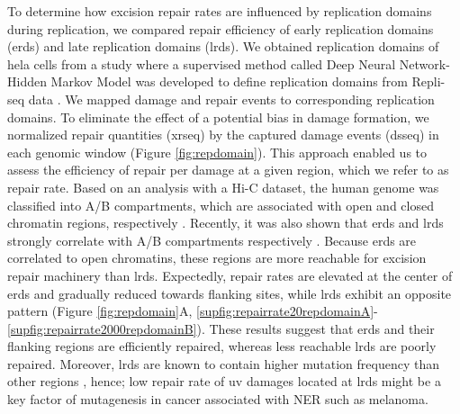 To determine how excision repair rates are influenced by replication domains during replication, we compared repair efficiency of early replication domains (\gls{erd}s) and late replication domains (\gls{lrd}s). We obtained replication domains of \gls{hela} cells from a study where a supervised method called Deep Neural Network-Hidden Markov Model was developed to define replication domains from Repli-seq data \citep{liu2016novo}. We mapped damage and repair events to corresponding replication domains. To eliminate the effect of a potential bias in damage formation, we normalized repair quantities (\gls{xrseq}) by the captured damage events (\gls{dsseq}) in each genomic window (Figure \ref{fig:repdomain}). This approach enabled us to assess the efficiency of repair per damage at a given region, which we refer to as repair rate. Based on an analysis with a Hi-C dataset, the human genome was classified into A/B compartments, which are associated with open and closed chromatin regions, respectively \citep{lieberman2009comprehensive}. Recently, it was also shown that \gls{erd}s and \gls{lrd}s strongly correlate with A/B compartments respectively \citep{pope2014topologically,ryba2010evolutionarily}. Because \gls{erd}s are correlated to open chromatins, these regions are more reachable for excision repair machinery than \gls{lrd}s. Expectedly, repair rates are elevated at the center of \gls{erd}s and gradually reduced towards flanking sites, while \gls{lrd}s exhibit an opposite pattern (Figure \ref{fig:repdomain}A, \ref{supfig:repairrate20repdomainA}-\ref{supfig:repairrate2000repdomainB}). These results suggest that \gls{erd}s and their flanking regions are efficiently repaired, whereas less reachable \gls{lrd}s are poorly repaired. Moreover, \gls{lrd}s are known to contain higher mutation frequency than other regions \citep{lawrence2013mutational,stamatoyannopoulos2009human}, hence; low repair rate of \gls{uv} damages located at \gls{lrd}s might be a key factor of mutagenesis in cancer associated with NER such as melanoma. 

